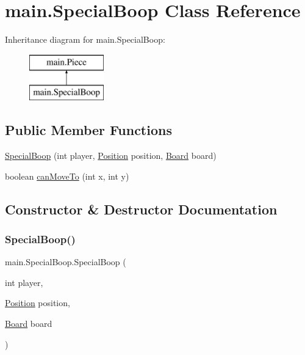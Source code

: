\hypertarget{classmain_1_1_special_boop}{}\section{main.\+Special\+Boop Class Reference}
\label{classmain_1_1_special_boop}
Inheritance diagram for main.\+Special\+Boop\+:\begin{figure}[H]
\begin{center}
\leavevmode
\includegraphics[height=2.000000cm]{classmain_1_1_special_boop}
\end{center}
\end{figure}
\subsection*{Public Member Functions}
\begin{DoxyCompactItemize}
\item 
\hyperlink{classmain_1_1_special_boop_aca8008b770552c3f6aaa617b8c45c463}{Special\+Boop} (int player, \hyperlink{classmain_1_1_position}{Position} position, \hyperlink{classmain_1_1_board}{Board} board)
\item 
boolean \hyperlink{classmain_1_1_special_boop_a51b7b52ee229b0a6894e76b8ac772ab6}{can\+Move\+To} (int x, int y)
\end{DoxyCompactItemize}


\subsection{Constructor \& Destructor Documentation}
\mbox{\label{classmain_1_1_special_boop_aca8008b770552c3f6aaa617b8c45c463}} 
\subsubsection{\texorpdfstring{Special\+Boop()}{SpecialBoop()}}
{\footnotesize\ttfamily main.\+Special\+Boop.\+Special\+Boop (\begin{DoxyParamCaption}\item[{int}]{player,  }\item[{\hyperlink{classmain_1_1_position}{Position}}]{position,  }\item[{\hyperlink{classmain_1_1_board}{Board}}]{board }\end{DoxyParamCaption})}


